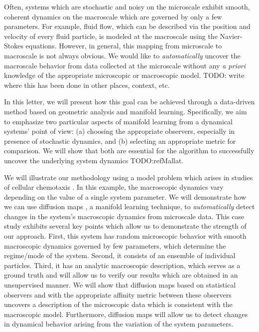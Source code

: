 \documentclass[prl, reprint, final, showkeys]{revtex4-1}
\begin{document}
 
Often, systems which are stochastic and noisy on the microscale exhibit smooth, coherent dynamics on the macroscale which are governed by only a few parameters.
%
For example, fluid flow, which can be described via the position and velocity of every fluid particle, is modeled at the macroscale using the Navier-Stokes equations.
%
However, in general, this mapping from microscale to macroscale is not always obvious.
%
We would like to {\em automatically} uncover the macroscale behavior from data collected at the microscale without any {\em a priori} knowledge of the appropriate microscopic or macroscopic model.
%
TODO: write where this has been done in other places, context, etc.

In this letter, we will present how this goal can be achieved through a data-driven method based on geometric analysis and manifold learning. Specifically, we aim to emphasize two particular aspects of manifold learning from a dynamical systems' point of view: (a) choosing the appropriate observers, especially in presence of stochastic dynamics, and (b) selecting an appropriate metric for comparison. 
%
We will show that both are essential for the algorithm to successfully uncover the underlying system dynamics TODO:refMallat. 

We will illustrate our methodology using a model problem which arises in studies of cellular chemotaxis \cite{othmer2000diffusion}.
%
In this example, the macroscopic dynamics vary depending on the value of a single system parameter.
%
We will demonstrate how we can use diffusion maps \cite{coifman2005geometric}, a manifold learning technique, to {\em automatically} detect changes in the system's macroscopic dynamics from microscale data.
%
This case study exhibits several key points which allow us to demonstrate the strength of our approach.
%
First, this system has random microscopic behavior with smooth macroscopic dynamics governed by few parameters, which determine the regime/mode of the system. 
%
Second, it consists of an ensemble of individual particles. 
%
Third, it has an analytic macroscopic description, which serves as a ground truth and will allow us to verify our results which are obtained in an unsupervised manner.
%
We will show that diffusion maps based on statistical observers and with the appropriate affinity metric between these observers uncovers a description of the microscopic data which is consistent with the macroscopic model.
%
Furthermore, diffusion maps will allow us to detect changes in dynamical behavior arising from the variation of the system parameters. 
\end{document}
